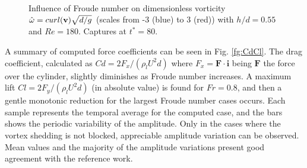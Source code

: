 \begin{figure}[htbp]
\begin{center}
{    } \\ 
 \\ 
 \\ 
  \end{center}
  \caption{\label{fg:vort_Re180} Influence of Froude number on dimensionless vorticity $\hat\omega = curl(\mathbf{v}) \sqrt{d/g}$ (scales from -3 (blue) to 3 (red)) with $h/d = 0.55$ and $Re=180$. Captures at $t^*=80$.
}
\end{figure}


A summary of computed force coefficients can be seen in Fig. \ref{fg:CdCl}. The drag coefficient, calculated as $Cd=2 F_x/(\rho_l U^2 d)$ where $F_x=\mathbf{F} \cdot \mathbf{i}$ being $\mathbf{F}$ the force over the cylinder,  slightly diminishes as Froude number increases. A maximum lift $Cl=2 F_y/(\rho_l U^2 d)$ (in absolute value) is found for $Fr = 0.8$, and then a gentle monotonic reduction for the largest Froude number cases occurs. Each sample represents the temporal average for the computed case, and the bars shows the periodic variability of the amplitude. Only in the cases where the vortex shedding is not blocked, appreciable amplitude variation can be observed. Mean values and the majority of the amplitude variations present good agreement with the reference work.

